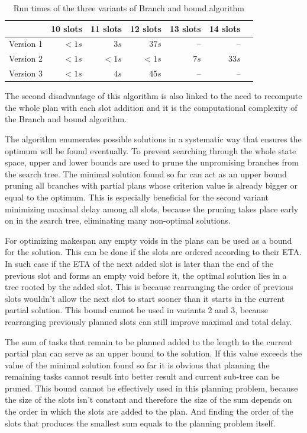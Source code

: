 \begin{table}[h]
  \centering
\begin{tabular}{ | l || r | r | r | r | r | r | }
\hline
			& 10 slots	& 11 slots	& 12 slots	& 13 slots	& 14 slots	\\
\hline
Version 1	& $< 1s$	& $3s$		& $37s$		& –			& –			\\
Version 2	& $< 1s$	& $< 1s$	& $< 1s$	& $7s$		& $33s$		\\
Version 3	& $< 1s$	& $4s$		& $45s$		& –			& –			\\
\hline
\end{tabular}
  \caption{Run times of the three variants of Branch and bound algorithm}
  \label{tab:alg5-runtime}
\end{table}

The second disadvantage of this algorithm is also linked to the need to recompute the whole plan with each slot addition and it is the computational complexity of the Branch and bound algorithm.

The algorithm enumerates possible solutions in a systematic way that ensures the optimum will be found eventually. To prevent searching through the whole state space, upper and lower bounds are used to prune the unpromising branches from the search tree. The minimal solution found so far can act as an upper bound pruning all branches with partial plans whose criterion value is already bigger or equal to the optimum. This is especially beneficial for the second variant minimizing maximal delay among all slots, because the pruning takes place early on in the search tree, eliminating many non-optimal solutions.

For optimizing makespan any empty voids in the plans can be used as a bound for the solution. This can be done if the slots are ordered according to their ETA. In such case if the ETA of the next added slot is later than the end of the previous slot and forms an empty void before it, the optimal solution lies in a tree rooted by the added slot. This is because rearranging the order of previous slots wouldn't allow the next slot to start sooner than it starts in the current partial solution. This bound cannot be used in variants 2 and 3, because rearranging previously planned slots can still improve maximal and total delay.

The sum of tasks that remain to be planned added to the length to the current partial plan can serve as an upper bound to the solution. If this value exceeds the value of the minimal solution found so far it is obvious that planning the remaining tasks cannot result into better result and current sub-tree can be pruned. This bound cannot be effectively used in this planning problem, because the size of the slots isn't constant and therefore the size of the sum depends on the order in which the slots are added to the plan. And finding the order of the slots that produces the smallest sum equals to the planning problem itself.


